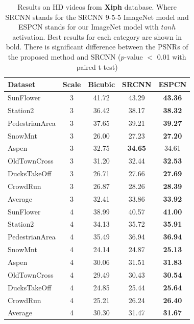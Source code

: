 \documentclass[10pt,twocolumn,letterpaper]{article}
\begin{document}
\begin{table}
\footnotesize
\begin{center}
\begin{tabular}{|l|c|c|c|c|}
\hline
Dataset & Scale  & Bicubic & SRCNN & ESPCN \\
\hline\hline
SunFlower & 3 & 41.72 & 43.29 & \textbf{43.36} \\
Station2 & 3 & 36.42  & 38.17  & \textbf{38.32}  \\
PedestrianArea & 3 & 37.65 & 39.21  & \textbf{39.27}  \\
SnowMnt & 3 & 26.00  & 27.23  & \textbf{27.20}  \\
Aspen & 3 & 32.75 & \textbf{34.65} & 34.61  \\
OldTownCross & 3 & 31.20  & 32.44  & \textbf{32.53}  \\
DucksTakeOff & 3 & 26.71 & 27.66  & \textbf{27.69}  \\
CrowdRun & 3 & 26.87  & 28.26  & \textbf{28.39}  \\
\hline\hline
Average & 3 & 32.41  & 33.86  & \textbf{33.92} \\
\hline\hline
SunFlower & 4 & 38.99  & 40.57 & \textbf{41.00} \\
Station2 & 4 & 34.13  & 35.72 & \textbf{35.91} \\
PedestrianArea & 4 & 35.49  & 36.94  & \textbf{36.94} \\
SnowMnt & 4 & 24.14  & 24.87  & \textbf{25.13} \\
Aspen & 4 & 30.06  & 31.51  & \textbf{31.83} \\
OldTownCross & 4 & 29.49  & 30.43  & \textbf{30.54} \\
DucksTakeOff & 4 & 24.85  & 25.44  & \textbf{25.64} \\
CrowdRun & 4 & 25.21  & 26.24  & \textbf{26.40} \\
\hline\hline
Average & 4 & 30.30 & 31.47 & \textbf{31.67} \\
\hline
\end{tabular}
\end{center}
\caption{Results on HD videos from \textbf{Xiph} database. Where SRCNN stands for the SRCNN 9-5-5 ImageNet model \cite{dong2015image} and ESPCN stands for our ImageNet model with $tanh$ activation. Best results for each category are shown in bold. There is significant difference between the PSNRs of the proposed method and SRCNN ($p$-value $<$ 0.01 with paired t-test)}
\label{tab:videoresulthd1}
\end{table}
\end{document}
